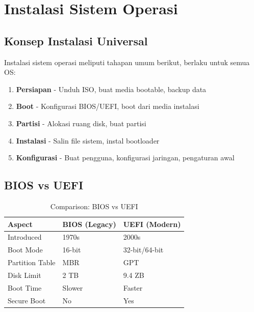 
\section{Instalasi Sistem Operasi}
\label{sec:os-installation}

\subsection{Konsep Instalasi Universal}

Instalasi sistem operasi meliputi tahapan umum berikut, berlaku untuk semua OS:

\begin{enumerate}
    \item \textbf{Persiapan} - Unduh ISO, buat media bootable, backup data
    \item \textbf{Boot} - Konfigurasi BIOS/UEFI, boot dari media instalasi
    \item \textbf{Partisi} - Alokasi ruang disk, buat partisi
    \item \textbf{Instalasi} - Salin file sistem, instal bootloader
    \item \textbf{Konfigurasi} - Buat pengguna, konfigurasi jaringan, pengaturan awal
\end{enumerate}

\subsection{BIOS vs UEFI}

\begin{table}[htbp]
    \centering
    \caption{Comparison: BIOS vs UEFI}
    \label{tab:bios-uefi}
    \begin{tabular}{@{}lll@{}}
        \toprule
        \textbf{Aspect} & \textbf{BIOS (Legacy)} & \textbf{UEFI (Modern)} \\
        \midrule
        Introduced & 1970s & 2000s \\
        Boot Mode & 16-bit & 32-bit/64-bit \\
        Partition Table & MBR & GPT \\
        Disk Limit & 2 TB & 9.4 ZB \\
        Boot Time & Slower & Faster \\
        Secure Boot & No & Yes \\
        \bottomrule
    \end{tabular}
\end{table}

